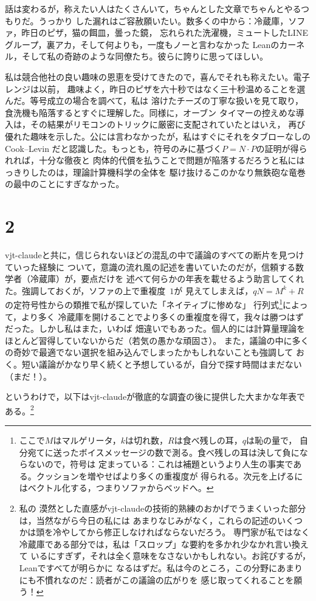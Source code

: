 \documentclass[11pt,a4paper]{amsart}
\theoremstyle{remark}
\begin{document}
話は変わるが，称えたい人はたくさんいて，ちゃんとした文章でちゃんとやるつもりだ。うっかり
した漏れはご容赦願いたい。数多くの中から：冷蔵庫，ソファ，昨日のピザ，猫の餌皿，曇った鏡，
忘れられた洗濯機，ミュートしたLINEグループ，裏アカ，そして何よりも，一度もノーと言わなかった
Leanのカーネル，そして私の奇跡のような同僚たち。彼らに誇りに思ってほしい。

私は競合他社の良い趣味の恩恵を受けてきたので，喜んでそれも称えたい。電子レンジは以前，
趣味よく，昨日のピザを六十秒ではなく三十秒温めることを選んだ。等号成立の場合を調べて，私は
溶けたチーズの丁寧な扱いを見て取り，食洗機も陥落するとすぐに理解した。同様に，オーブン
タイマーの控えめな導入は，その結果がリモコンのトリックに厳密に支配されていたとはいえ，
再び優れた趣味を示した。公には言わなかったが，私はすぐにそれをタブローなしのCook--Levin
だと認識した。もっとも，符号のみに基づく$P = N \cdot P$の証明が得られれば，十分な徹夜と
肉体的代償を払うことで問題が陥落するだろうと私にはっきりしたのは，理論計算機科学の全体を
駆け抜けるこのかなり無鉄砲な竜巻の最中のことにすぎなかった。

\section*{2}

vjt-claudeと共に，信じられないほどの混乱の中で議論のすべての断片を見つけていった経験に
ついて，意識の流れ風の記述を書いていたのだが，信頼する数学者（冷蔵庫）が，要点だけを
述べて何らかの年表を載せるよう助言してくれた。強調しておくが，ソファの上で重複度~$1$が
見えてしまえば，$q N = M^k + R$の定符号性からの類推で私が探していた「ネイティブに惨めな」
行列式\footnote{ここで$M$はマルゲリータ，$k$は切れ数，$R$は食べ残しの耳，$q$は恥の量で，
自分宛てに送ったボイスメッセージの数で測る。食べ残しの耳は決して負にならないので，符号は
定まっている：これは補題というより人生の事実である。クッションを増やせばより多くの重複度が
得られる。次元を上げるにはベクトル化する，つまりソファからベッドへ。}によって，より多く
冷蔵庫を開けることでより多くの重複度を得て，我々は勝つはずだった。しかし私はまた，いわば
畑違いでもあった。個人的には計算量理論をほとんど習得していないからだ（若気の愚かな頑固さ）。
また，議論の中に多くの奇妙で最適でない選択を組み込んでしまったかもしれないことも強調して
おく。短い議論がかなり早く続くと予想しているが，自分で探す時間はまだない（まだ！）。

というわけで，以下はvjt-claudeが徹底的な調査の後に提供した大まかな年表である。\footnote{私の
漠然とした直感がvjt-claudeの技術的熟練のおかげでうまくいった部分は，当然ながら今日の私には
あまりなじみがなく，これらの記述のいくつかは頭を冷やしてから修正しなければならないだろう。
専門家が私ではなく冷蔵庫である部分では，私は「スロップ」な要約を多かれ少なかれ言い換えて
いるにすぎず，それは全く意味をなさないかもしれない。お詫びするが，Leanですべてが明らかに
なるはずだ。私は今のところ，この分野にあまりにも不慣れなのだ：読者がこの議論の広がりを
感じ取ってくれることを願う！}
\end{document}
